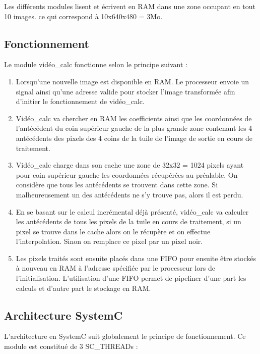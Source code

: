 {{Les différents modules lisent et écrivent en RAM dans une zone occupant en tout 10 images. ce qui correspond à 10x640x480 = 3Mo.

	\subsection{Fonctionnement}

Le module vidéo\_calc fonctionne selon le principe suivant : 

\begin{enumerate}

\item  Lorsqu'une nouvelle image est disponible en RAM. Le processeur envoie un signal ainsi qu'une adresse valide pour stocker l'image transformée afin d'initier le fonctionnement de vidéo\_calc.

\item Vidéo\_calc va chercher en RAM les coefficients ainsi que les coordonnées de l'antécédent du coin supérieur gauche de la plus grande zone contenant les 4 antécédents des pixels des 4 coins de la tuile de l'image de sortie en cours de traitement.

\item Vidéo\_calc charge dans son cache une zone de 32x32 = 1024 pixels ayant pour coin supérieur gauche les coordonnées récupérées au préalable. On considère que tous les antécédents se trouvent dans cette zone. Si malheureusement un des antécédents ne s'y trouve pas, alors il est perdu.

\item En se basant sur le calcul incrémental déjà présenté, vidéo\_calc va calculer les antécédents de tous les pixels de la tuile en cours de traitement, si un pixel se trouve dans le cache alors on le récupère et  on effectue l'interpolation. Sinon on remplace ce pixel par un pixel noir.

\item Les pixels traités sont ensuite placés dans une FIFO pour ensuite être stockés à nouveau en RAM à l'adresse spécifiée par le processeur lors de l'initialisation. L'utilisation d'une FIFO permet de pipeliner d'une part les calculs et d'autre part le stockage en RAM.

\end{enumerate}
	
	\subsection{Architecture SystemC}
L'architecture en SystemC suit globalement le principe de fonctionnement. Ce module est constitué de 3 SC\_THREADs : 

}}
